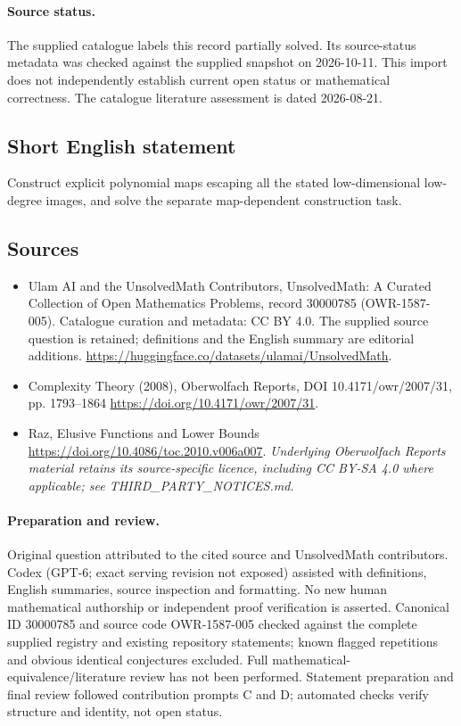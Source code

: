 \documentclass[11pt]{article}
\begin{document}
\paragraph{Source status.}
The supplied catalogue labels this record partially solved. Its source-status metadata was checked against the supplied snapshot on 2026-10-11. This import does not independently establish current open status or mathematical correctness. The catalogue literature assessment is dated 2026-08-21.
\subsection{Short English statement}
Construct explicit polynomial maps escaping all the stated low-dimensional low-degree images, and solve the separate map-dependent construction task.
\subsection{Sources}
\begin{itemize}
\item[\hypertarget{source:30000785:1}{S1}] Ulam AI and the UnsolvedMath Contributors, UnsolvedMath: A Curated Collection of Open Mathematics Problems, record 30000785 (OWR-1587-005). Catalogue curation and metadata: CC BY 4.0. The supplied source question is retained; definitions and the English summary are editorial additions.
\url{https://huggingface.co/datasets/ulamai/UnsolvedMath}.
\item[\hypertarget{source:30000785:2}{S2}] Complexity Theory (2008), Oberwolfach Reports, DOI 10.4171/owr/2007/31, pp. 1793--1864
\url{https://doi.org/10.4171/owr/2007/31}.
\item[\hypertarget{source:30000785:3}{S3}] Raz, Elusive Functions and Lower Bounds
\url{https://doi.org/10.4086/toc.2010.v006a007}.
\textit{Underlying Oberwolfach Reports material retains its source-specific licence, including CC BY-SA 4.0 where applicable; see THIRD\_PARTY\_NOTICES.md.}
\end{itemize}
\paragraph{Preparation and review.}
Original question attributed to the cited source and UnsolvedMath contributors. Codex (GPT-6; exact serving revision not exposed) assisted with definitions, English summaries, source inspection and formatting. No new human mathematical authorship or independent proof verification is asserted. Canonical ID 30000785 and source code OWR-1587-005 checked against the complete supplied registry and existing repository statements; known flagged repetitions and obvious identical conjectures excluded. Full mathematical-equivalence/literature review has not been performed. Statement preparation and final review followed contribution prompts C and D; automated checks verify structure and identity, not open status.
\label{end:30000785}
\end{document}

